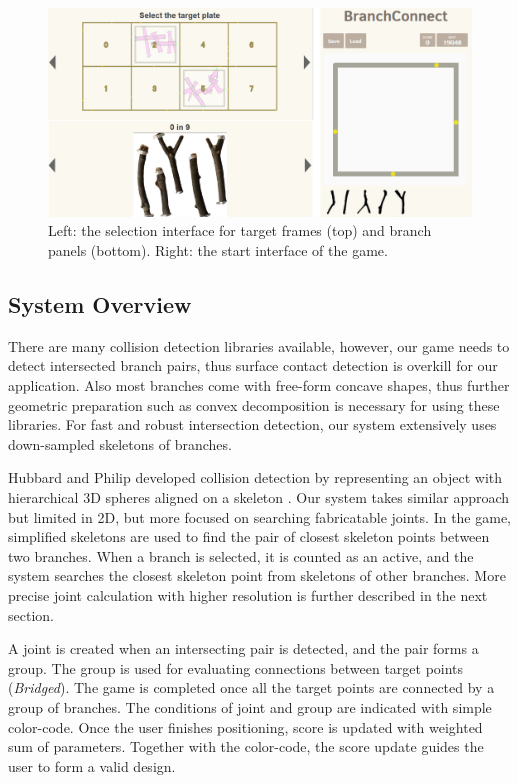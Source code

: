 \begin{figure}[H]
  \begin{center}
    \includegraphics[width = 0.4\paperwidth]{images/interface/game_interface.png}
    \caption{Left: the selection interface for target frames (top) and branch panels (bottom). Right: the start interface of the game.}
    \label{fig:game_interface}
  \end{center}
\end{figure}
%
\subsection{System Overview}
There are many collision detection libraries available, however, our game needs to detect intersected branch pairs, thus surface contact detection is overkill for our application.
Also most branches come with free-form concave shapes, thus further geometric preparation such as convex decomposition is necessary for using these libraries.
For fast and robust intersection detection, our system extensively uses down-sampled skeletons of branches.

Hubbard and Philip developed collision detection by representing an object with hierarchical 3D spheres aligned on a skeleton \cite{Hubbard:1996:APS:231731.231732}.
Our system takes similar approach but limited in 2D, but more focused on searching fabricatable joints.
In the game, simplified skeletons are used to find the pair of closest skeleton points between two branches.
When a branch is selected, it is counted as an active, and the system searches the closest skeleton point from skeletons of other branches.
More precise joint calculation with higher resolution is further described in the next section.

A joint is created when an intersecting pair is detected, and the pair forms a group.
The group is used for evaluating connections between target points (\textit{Bridged}).
The game is completed once all the target points are connected by a group of branches.
The conditions of joint and group are indicated with simple color-code.
Once the user finishes positioning, score is updated with weighted sum of parameters.
Together with the color-code, the score update guides the user to form a valid design.



